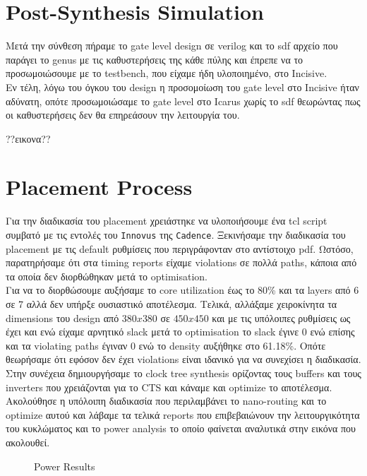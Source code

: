 \documentclass[12pt,a4paper]{article}
\begin{document}
	\section{\textcolor{PineGreen}{Post-Synthesis Simulation}}
	Μετά την σύνθεση πήραμε το gate level design σε verilog και το sdf αρχείο που παράγει το genus με τις καθυστερήσεις της κάθε πύλης και έπρεπε να το προσωμοιώσουμε με το testbench, που είχαμε ήδη υλοποιημένο, στο Incisive.\\
	Εν τέλη, λόγω του όγκου του design η προσομοίωση του gate level στο Incisive ήταν αδύνατη, οπότε προσωμοιώσαμε το gate level στο Icarus χωρίς το sdf θεωρώντας πως οι καθυστερήσεις δεν θα επηρεάσουν την λειτουργία του. 
	
	??εικονα?? 
    
 	\section{\textcolor{PineGreen}{Placement Process}}
 	Για την διαδικασία του placement χρειάστηκε να υλοποιήσουμε ένα tcl script συμβατό με τις εντολές του \verb|Innovus| της \verb|Cadence|. Ξεκινήσαμε την διαδικασία του placement με τις default ρυθμίσεις που περιγράφονταν στο αντίστοιχο pdf. Ωστόσο, παρατηρήσαμε ότι στα timing reports είχαμε violations σε πολλά paths, κάποια από τα οποία δεν διορθώθηκαν μετά το optimisation.\\
 	Για να το διορθώσουμε αυξήσαμε το core utilization έως το 80\% και τα layers από 6 σε 7 αλλά δεν υπήρξε ουσιαστικό αποτέλεσμα. Τελικά, αλλάξαμε χειροκίνητα τα dimensions του design από $380 x 380$ σε $450 x 450$ και με τις υπόλοιπες ρυθμίσεις ως έχει και ενώ είχαμε αρνητικό slack μετά το optimisation το slack έγινε 0 ενώ επίσης και τα violating paths έγιναν 0 ενώ το density αυξήθηκε στο 61.18\%. Οπότε θεωρήσαμε ότι εφόσον δεν έχει violations είναι ιδανικό για να συνεχίσει η διαδικασία.\\
 	Στην συνέχεια δημιουργήσαμε το clock tree synthesis ορίζοντας τους buffers και τους inverters που χρειάζονται για το CTS και κάναμε και optimize το αποτέλεσμα. Ακολούθησε η υπόλοιπη διαδικασία που περιλαμβάνει το nano-routing και το optimize αυτού και λάβαμε τα τελικά reports που επιβεβαιώνουν την λειτουργικότητα του κυκλώματος και το power analysis το οποίο φαίνεται αναλυτικά στην εικόνα που ακολουθεί.
 	\begin{figure} [H]
 		\caption{Power Results}
 		\label{Power Results}
 	\end{figure}
 
\end{document}

